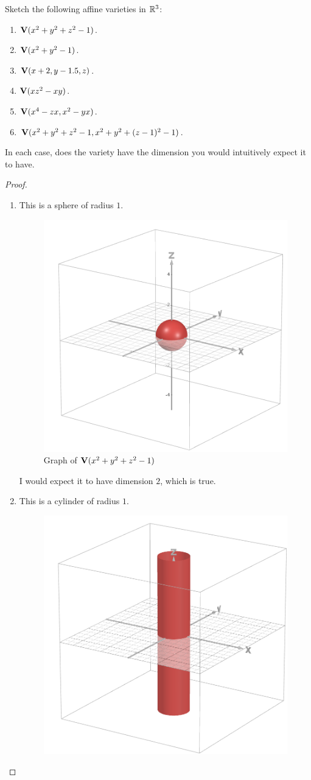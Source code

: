 \begin{exercise}{4}
Sketch the following affine varieties in $\mathbb{R}^3$:
\begin{enumerate}
    \item $\mathbf{V}(x^2 + y^2 + z^2 - 1)$.
    \item $\mathbf{V}(x^2 + y^2 - 1)$.
    \item $\mathbf{V}(x+2, y-1.5, z)$.
    \item $\mathbf{V}(xz^2 - xy)$.
    \item $\mathbf{V}(x^4 - zx, x^2 - yx)$.
    \item $\mathbf{V}(x^2 + y^2 + z^2 - 1, x^2 + y^2 + (z-1)^2 - 1)$.
\end{enumerate}
In each case, does the variety have the dimension you would intuitively expect it to have.
\end{exercise}
\begin{proof}
    \begin{enumerate}
        \item This is a sphere of radius $1$.
        \begin{figure}[H]
            \centering
            \includegraphics[width=0.5\linewidth]{cox-little-oshea/assets/sec1-2-ex4a.png}
            \caption{Graph of $\mathbf{V}(x^2+y^2+z^2-1)$}
            \label{fig:sec1-2-ex4a}
        \end{figure}
        I would expect it to have dimension $2$, which is true.
        \item This is a cylinder of radius $1$.
        \begin{figure}[H]
            \centering
            \includegraphics[width=0.5\linewidth]{cox-little-oshea/assets/sec1-2-ex4b.png}

\end{figure}
\end{enumerate}
\end{proof}
